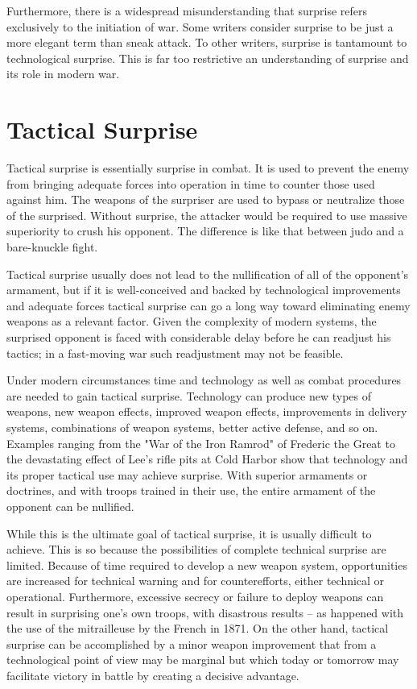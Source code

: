 Furthermore, there is a widespread misunderstanding that surprise refers exclusively to the initiation of war. Some writers consider surprise to be just a more elegant term than sneak attack. To other writers, surprise is tantamount to technological surprise. This is far too restrictive an understanding of surprise and its role in modern war.

\section{Tactical Surprise}
Tactical surprise is essentially surprise in combat. It is used to prevent the enemy from bringing adequate forces into operation in time to counter those used against him. The weapons of the surpriser are used to bypass or neutralize those of the surprised. Without surprise, the attacker would be required to use massive superiority to crush his opponent. The difference is like that between judo and a bare-knuckle fight.

Tactical surprise usually does not lead to the nullification of all of the opponent's armament, but if it is well-conceived and backed by technological improvements and adequate forces tactical surprise can go a long way toward eliminating enemy weapons as a relevant factor. Given the complexity of modern systems, the surprised opponent is faced with considerable delay before he can readjust his tactics; in a fast-moving war such readjustment may not be feasible.

Under modern circumstances time and technology as well as combat procedures are needed to gain tactical surprise. Technology can produce new types of weapons, new weapon effects, improved weapon effects, improvements in delivery systems, combinations of weapon systems, better active defense, and so on. Examples ranging from the "War of the Iron Ramrod" of Frederic the Great to the devastating effect of Lee's rifle pits at Cold Harbor show that technology and its proper tactical use may achieve surprise. With superior armaments or doctrines, and with troops trained in their use, the entire armament of the opponent can be nullified.

While this is the ultimate goal of tactical surprise, it is usually difficult to achieve. This is so because the possibilities of complete technical surprise are limited. Because of time required to develop a new weapon system, opportunities are increased for technical warning and for counterefforts, either technical or operational. Furthermore, excessive secrecy or failure to deploy weapons can result in surprising one's own troops, with disastrous results -- as happened with the use of the mitrailleuse by the French in 1871. On the other hand, tactical surprise can be accomplished by a minor weapon improvement that from a technological point of view may be marginal but which today or tomorrow may facilitate victory in battle by creating a decisive advantage.

